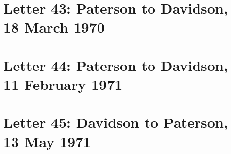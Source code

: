 \documentclass[a4paper,11pt,abstracton,hidelinks]{scrartcl}
\begin{document}
\section{Letter 43: Paterson to Davidson, 18 March 1970}


\section{Letter 44: Paterson to Davidson, 11 February 1971}


\section{Letter 45: Davidson to Paterson, 13 May 1971}



\printbibliography
\end{document}
